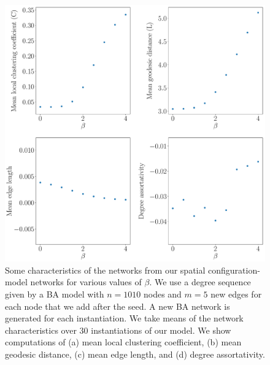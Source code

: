 \documentclass[%
 reprint,
 amsmath,amssymb,
 aps,
]{revtex4-1}
\begin{document}
\begin{figure}
    \centering
    \includegraphics[width=1.0\linewidth]{spatial_configuration_metrics2.pdf}
    \caption{Some characteristics of the networks from our spatial configuration-model networks for various values of $\beta$. We use a degree sequence given by a BA model with $n=1010$ nodes and $m=5$ new edges for each node that we add after the seed. {\color{red}A new BA network is generated for each instantiation. }We take means of the network characteristics over $30$ instantiations of our model.
     We show computations of (a) mean local clustering coefficient, (b) mean geodesic distance, (c) mean edge length, and (d) degree assortativity.
    }
    \label{fig:spatial_configuration_metrics}
\end{figure}
\end{document}
